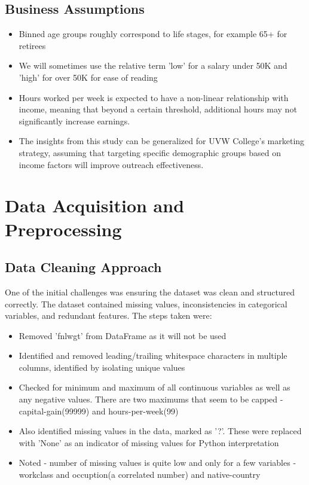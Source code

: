 \documentclass[journal,onecolumn]{IEEEtran}
\begin{document}
\subsection{Business Assumptions}
\begin{itemize}
    \item Binned age groups roughly correspond to life stages, for example 65+ for retirees
    \item We will sometimes use the relative term 'low' for a salary under 50K and 'high' for over 50K for ease of reading
    \item Hours worked per week is expected to have a non-linear relationship with income, meaning that beyond a certain threshold, additional hours may not significantly increase earnings.
    \item The insights from this study can be generalized for UVW College’s marketing strategy, assuming that targeting specific demographic groups based on income factors will improve outreach effectiveness.
\end{itemize}
\section{Data Acquisition and Preprocessing}


\subsection{Data Cleaning Approach}
One of the initial challenges was ensuring the dataset was clean and structured correctly. The dataset contained missing values, inconsistencies in categorical variables, and redundant features. The steps taken were:
\begin{itemize}
    \item Removed 'fnlwgt' from DataFrame as it will not be used
    \item Identified and removed leading/trailing whitespace characters in multiple columns, identified by isolating unique values
    \item Checked for minimum and maximum of all continuous variables as well as any negative values. There are two maximums that seem to be capped - capital-gain(99999) and hours-per-week(99)
    \item Also identified missing values in the data, marked as '?'. These were replaced with 'None' as an indicator of missing values for Python interpretation
    \item Noted - number of missing values is quite low and only for a few variables - workclass and occuption(a correlated number) and native-country
\end{itemize}
\end{document}
